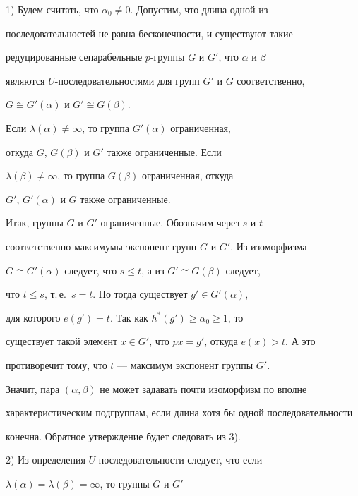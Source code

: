 \begin{pf}


1) Будем считать, что $\alpha_0\neq0$. Допустим, что длина одной из


последовательностей не равна бесконечности, и существуют такие


редуцированные сепарабельные $p$-группы $G$ и $G'$, что $\alpha$ и $\beta$


являются $U$-последовательностями для групп $G'$ и $G$ соответственно,


$G\cong G'(\alpha)$ и $G'\cong G(\beta)$.





Если $\lambda(\alpha)\neq\infty$, то группа $G'(\alpha)$ ограниченная,


откуда $G$, $G(\beta)$ и $G'$ также ограниченные. Если


$\lambda(\beta)\neq\infty$, то группа $G(\beta)$ ограниченная, откуда


$G'$, $G'(\alpha)$ и $G$ также ограниченные.





Итак, группы $G$ и $G'$ ограниченные. Обозначим через $s$ и $t$


соответственно максимумы экспонент групп $G$ и $G'$. Из изоморфизма


$G\cong G'(\alpha)$ следует, что $s\leq t$, а из $G'\cong G(\beta)$ следует,


что $t\leq s$, т.\,е.\ $s=t$. Но тогда существует $g'\in G'(\alpha)$,


для которого $e(g')=t$. Так как $h^*(g')\geq \alpha_0\geq 1$, то


существует такой элемент $x\in G'$, что $px=g'$, откуда $e(x)>t$. А это


противоречит тому, что $t$ --- максимум экспонент группы $G'$.





Значит, пара $(\alpha,\beta)$ не может задавать почти изоморфизм по вполне


характеристическим подгруппам, если длина хотя бы одной последовательности


конечна. Обратное утверждение будет следовать из 3).





2) Из определения $U$-последовательности следует, что если


$\lambda(\alpha)=\lambda(\beta)=\infty$, то группы $G$ и $G'$



\end{pf}
